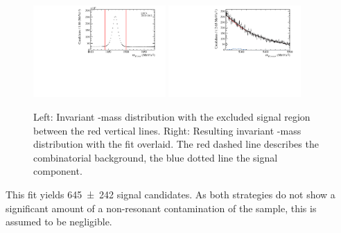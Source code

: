 \begin{figure}[tbp]
    \centering
    \includegraphics[width=0.45\textwidth]{06selection/figs/DmassCut.pdf}
    \includegraphics[width=0.45\textwidth]{06selection/figs/Resulting_Bmass.pdf}
    \caption{Left: Invariant \Dm-mass distribution with the excluded signal region between the red vertical lines.
    Right: Resulting invariant \Bz-mass distribution with the fit overlaid. The red dashed line describes the combinatorial background, the blue dotted line the signal component.}
    \label{fig:nonRes_Try2}
\end{figure}
This fit yields \num{645\pm242} signal candidates.
As both strategies do not show a significant amount of a non-resonant contamination of the sample, this is assumed to be negligible.
